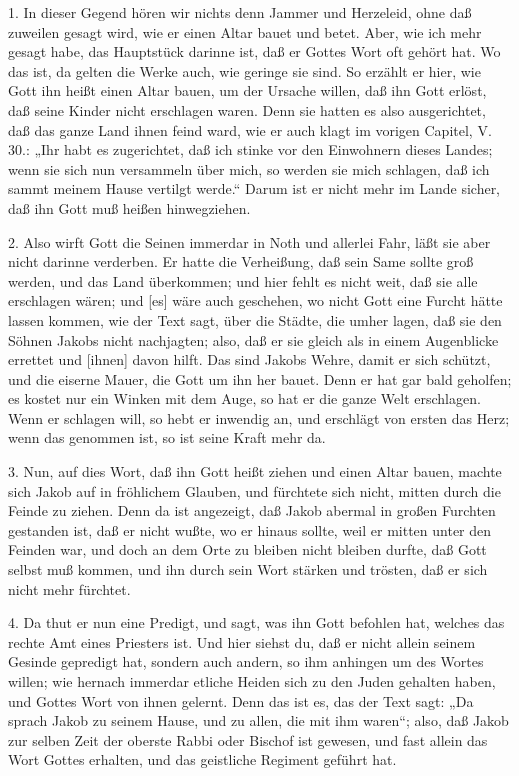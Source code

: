 1. In dieser Gegend hören wir nichts denn Jammer und Herzeleid, ohne daß zuweilen gesagt wird, wie er einen Altar bauet und betet. Aber, wie ich mehr gesagt habe, das Hauptstück darinne ist, daß er Gottes Wort oft gehört hat. Wo das ist, da gelten die Werke auch, wie geringe sie sind. So erzählt er hier, wie Gott ihn heißt einen Altar bauen, um der Ursache willen, daß ihn Gott erlöst, daß seine Kinder nicht erschlagen waren. Denn sie hatten es also ausgerichtet, daß das ganze Land ihnen feind ward, wie er auch klagt im vorigen Capitel, V. 30.: „Ihr habt es zugerichtet, daß ich stinke vor den Einwohnern dieses Landes; wenn sie sich nun versammeln über mich, so werden sie mich schlagen, daß ich sammt meinem Hause vertilgt werde.“ Darum ist er nicht mehr im Lande sicher, daß ihn Gott muß heißen hinwegziehen.

2. Also wirft Gott die Seinen immerdar in Noth und allerlei Fahr, läßt sie aber nicht darinne verderben. Er hatte die Verheißung, daß sein Same sollte groß werden, und das Land überkommen; und hier fehlt es nicht weit, daß sie alle erschlagen wären; und [es] wäre auch geschehen, wo nicht Gott eine Furcht hätte lassen kommen, wie der Text sagt, über die Städte, die umher lagen, daß sie den Söhnen Jakobs nicht nachjagten; also, daß er sie gleich als in einem Augenblicke errettet und [ihnen] davon hilft. Das sind Jakobs Wehre, damit er sich schützt, und die eiserne Mauer, die Gott um ihn her bauet. Denn er hat gar bald geholfen; es kostet nur ein Winken mit dem Auge, so hat er die ganze Welt erschlagen. Wenn er schlagen will, so hebt er inwendig an, und erschlägt von ersten das Herz; wenn das genommen ist, so ist seine Kraft mehr da.

3. Nun, auf dies Wort, daß ihn Gott heißt ziehen und einen Altar bauen, machte sich Jakob auf in fröhlichem Glauben, und fürchtete sich nicht, mitten durch die Feinde zu ziehen. Denn da ist angezeigt, daß Jakob abermal in großen Furchten gestanden ist, daß er nicht wußte, wo er hinaus sollte, weil er mitten unter den Feinden war, und doch an dem Orte zu bleiben nicht bleiben durfte, daß Gott selbst muß kommen, und ihn durch sein Wort stärken und trösten, daß er sich nicht mehr fürchtet.

4. Da thut er nun eine Predigt, und sagt, was ihn Gott befohlen hat, welches das rechte Amt eines Priesters ist. Und hier siehst du, daß er nicht allein seinem Gesinde gepredigt hat, sondern auch andern, so ihm anhingen um des Wortes willen; wie hernach immerdar etliche Heiden sich zu den Juden gehalten haben, und Gottes Wort von ihnen gelernt. Denn das ist es, das der Text sagt: „Da sprach Jakob zu seinem Hause, und zu allen, die mit ihm waren“; also, daß Jakob zur selben Zeit der oberste Rabbi oder Bischof ist gewesen, und fast allein das Wort Gottes erhalten, und das geistliche Regiment geführt hat.

